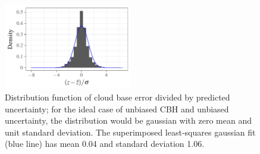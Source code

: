 \documentclass[essd,manuscript]{copernicus}\usepackage[]{graphicx}\usepackage[]{color}
\newenvironment{knitrout}{}{} %
\begin{document}
\begin{figure}
  \centering
\begin{knitrout}
\color{fgcolor}

{\centering \includegraphics[width=0.5\textwidth]{figure/method-combo-eval-pull-1} 

}



\end{knitrout}
  \caption{Distribution function of cloud base error divided by predicted
    uncertainty; for the ideal case of unbiased CBH and unbiased
    uncertainty, the distribution would be gaussian with zero mean and unit
    standard deviation.  The superimposed least-squares gaussian fit (blue line)
    has mean 0.04 and
    standard deviation 1.06.}
  \label{fig:pull}
\end{figure}


\end{document}

